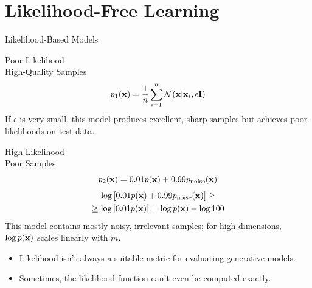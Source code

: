 \documentclass{beamer}
\renewcommand{\eqpause}{}
\begin{document}
\section{Likelihood-Free Learning}
\begin{frame}{Likelihood-Based Models}
	\begin{minipage}[t]{0.48\columnwidth}
		\vspace{-0.3cm}
		\begin{block}{Poor Likelihood \\ High-Quality Samples}
			\vspace{-0.3cm}
			\[
				p_1(\mathbf{x}) = \frac{1}{n} \sum_{i=1}^n \mathcal{N}(\mathbf{x} | \mathbf{x}_i, \epsilon \mathbf{I})
			\]
			If $\epsilon$ is very small, this model produces excellent, sharp samples but achieves poor likelihoods on test data.
		\end{block}	
	\end{minipage}%
	\begin{minipage}[t]{0.52\columnwidth}
		\eqpause
		\vspace{-0.3cm}
		\begin{block}{High Likelihood \\ Poor Samples}
			\vspace{-0.5cm}
			\[
				p_2(\mathbf{x}) = 0.01p(\mathbf{x}) + 0.99p_{\text{noise}}(\mathbf{x})
			\]
			\vspace{-1.0cm}
			\begin{multline*}
				\log \left[ 0.01p(\mathbf{x}) + 0.99p_{\text{noise}}(\mathbf{x}) \right] \geq \\ \geq \log \left[ 0.01p(\mathbf{x}) \right]  = \log p(\mathbf{x}) - \log 100
			\end{multline*}
			This model contains mostly noisy, irrelevant samples; for high dimensions, $\log p(\mathbf{x})$ scales linearly with $m$.
		\end{block}
	\end{minipage}
	\eqpause
	\begin{itemize}
		\item Likelihood isn't always a suitable metric for evaluating generative models.
		\item Sometimes, the likelihood function can't even be computed exactly.
	\end{itemize}
\end{frame}
\end{document}
